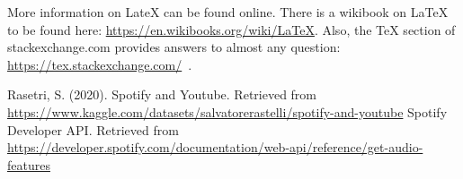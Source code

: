\documentclass[11pt]{article} %
\begin{document}
More information on LateX can be found online. There is a wikibook on LaTeX
to be found here: \url{https://en.wikibooks.org/wiki/LaTeX}. Also, the
TeX section of stackexchange.com provides answers to almost any question:
\url{https://tex.stackexchange.com/}~\cite{stackexchange}.

\newpage


\begin{thebibliography}{9}
	 Rasetri, S. (2020). Spotify and Youtube. Retrieved from \href{https://www.kaggle.com/datasets/salvatorerastelli/spotify-and-youtube}{https://www.kaggle.com/datasets/salvatorerastelli/spotify-and-youtube}
	 Spotify Developer API. Retrieved from \href{https://developer.spotify.com/documentation/web-api/reference/get-audio-features}{https://developer.spotify.com/documentation/web-api/reference/get-audio-features}
\end{thebibliography}
\end{document}
